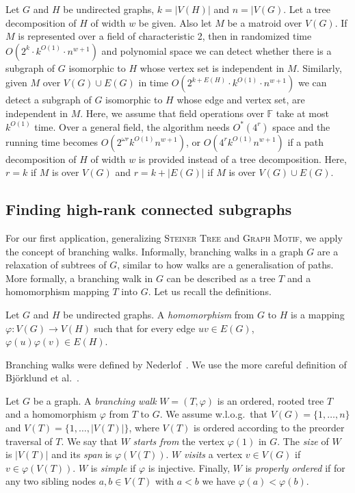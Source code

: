 \documentclass{theoretics}
\newcommand{\F}{\ensuremath{\mathbb F}\xspace}
\begin{document}
\begin{theorem}
  \label{thm:subgraph-hom}
  Let $G$ and $H$ be undirected graphs, $k=|V(H)|$ and $n=|V(G)$.
  Let a tree decomposition of $H$ of width $w$ be given. Also let $M$
  be a matroid over $V(G)$. If $M$ is represented over a field of
  characteristic 2, then in randomized time $O(2^k \cdot k^{O(1)} \cdot n^{w+1})$
  and polynomial space we can detect whether there is a subgraph of $G$ 
  isomorphic to $H$ whose vertex set is independent in $M$.
  Similarly, given $M$ over 
  $V(G) \cup E(G)$ in time
  $O(2^{k+E(H)} \cdot k ^{O(1)} \cdot n^{w+1})$
  we can detect a subgraph of $G$ isomorphic to $H$ whose
  edge and vertex set, are independent in $M$.
  Here, we assume that field operations over $\F$ take at most $k^{O(1)}$ time.
  Over a general field, the algorithm needs $O^*(4^r)$ space and 
  the running time becomes $O(2^{\omega r} k^{O(1)} n^{w+1})$,
  or $O(4^r k^{O(1)} n^{w+1})$ if a path decomposition of $H$ of width $w$ is provided
  instead of a tree decomposition. Here, $r=k$ if $M$ is over $V(G)$
  and $r=k+|E(G)|$ if $M$ is over $V(G) \cup E(G)$.
\end{theorem}

\subsection{Finding high-rank connected subgraphs}

For our first application, generalizing \textsc{Steiner Tree} and
\textsc{Graph Motif}, we apply the concept of branching walks.
Informally, branching walks in a graph $G$ are a relaxation of
subtrees of $G$, similar to how walks are a generalisation of paths.
More formally, a branching walk in $G$ can be described as a tree
$T$ and a homomorphism mapping $T$ into $G$. Let us recall the
definitions. 

\begin{definition}
  Let $G$ and $H$ be undirected graphs. A \emph{homomorphism} from $G$
  to $H$ is a mapping $\varphi \colon V(G) \to V(H)$ such that
  for every edge $uv \in E(G)$, $\varphi(u)\varphi(v) \in E(H)$. 
\end{definition}

Branching walks were defined by Nederlof~\cite{Nederlof13algorithmica}.
We use the more careful definition of Björklund et al.~\cite{BjorklundKK16}.

\begin{definition}
  Let $G$ be a graph. A \emph{branching walk} $W=(T,\varphi)$
  is an ordered, rooted tree $T$ and a homomorphism
  $\varphi$ from $T$ to $G$.
  We assume w.l.o.g.\ that $V(G)=\{1,\ldots,n\}$ and $V(T)=\{1,\ldots,|V(T)|\}$,
  where $V(T)$ is ordered according to the preorder traversal of $T$.
  We say that $W$ \emph{starts from} the vertex $\varphi(1)$ in $G$.
  The \emph{size} of $W$ is $|V(T)|$ and its \emph{span} is $\varphi(V(T))$.   
  $W$ \emph{visits} a vertex $v \in V(G)$ if $v \in \varphi(V(T))$.
  $W$ is \emph{simple} if $\varphi$ is injective. 
  Finally, $W$ is \emph{properly ordered}
  if for any two sibling nodes $a, b \in V(T)$ with $a<b$
  we have $\varphi(a)<\varphi(b)$. 
\end{definition}
\end{document}
